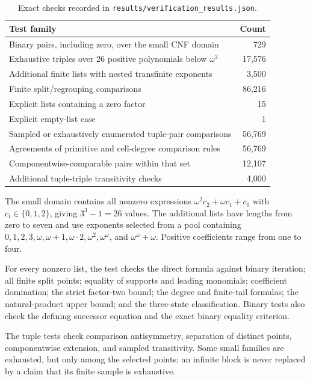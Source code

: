 \documentclass[11pt,letterpaper]{article}
\theoremstyle{definition}
\theoremstyle{remark}
\begin{document}
\begin{table}[htbp]
\centering
\caption{Exact checks recorded in \texttt{results/verification\_results.json}.}
\label{tab:tests}
\begin{tabular}{@{}p{}r@{}}
\toprule
Test family & Count\\
\midrule
Binary pairs, including zero, over the small CNF domain & 729\\
Exhaustive triples over 26 positive polynomials below $\omega^3$ & 17,576\\
Additional finite lists with nested transfinite exponents & 3,500\\
Finite split/regrouping comparisons & 86,216\\
Explicit lists containing a zero factor & 15\\
Explicit empty-list case & 1\\
Sampled or exhaustively enumerated tuple-pair comparisons & 56,769\\
Agreements of primitive and cell-degree comparison rules & 56,769\\
Componentwise-comparable pairs within that set & 12,107\\
Additional tuple-triple transitivity checks & 4,000\\
\bottomrule
\end{tabular}
\end{table}

The small domain contains all nonzero expressions
$\omega^2c_2+\omega c_1+c_0$ with $c_i\in\{0,1,2\}$, giving $3^3-1=26$
values. The additional lists have lengths from zero to seven and use
exponents selected from a pool containing $0,1,2,3,\omega,\omega+1,
\omega\cdot2,\omega^2,\omega^\omega$, and $\omega^\omega+\omega$.
Positive coefficients range from one to four.

For every nonzero list, the test checks the direct formula against binary
iteration; all finite split points; equality of supports and leading
monomials; coefficient domination; the strict factor-two bound; the degree
and finite-tail formulas; the natural-product upper bound; and the
three-state classification. Binary tests also check the defining successor
equation and the exact binary equality criterion.

The tuple tests check comparison antisymmetry, separation of distinct
points, componentwise extension, and sampled transitivity. Some small
families are exhausted, but only among the selected points; an infinite
block is never replaced by a claim that its finite sample is exhaustive.
\end{document}
